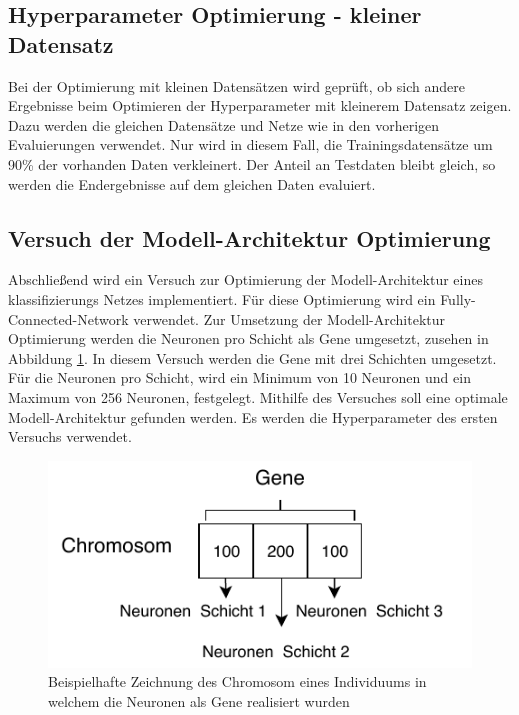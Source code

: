 \subsection{Hyperparameter Optimierung - kleiner Datensatz}
Bei der Optimierung mit kleinen Datensätzen wird geprüft, ob sich andere Ergebnisse beim Optimieren der Hyperparameter mit kleinerem Datensatz zeigen. Dazu werden die gleichen Datensätze und Netze wie in den vorherigen Evaluierungen verwendet. Nur wird in diesem Fall, die Trainingsdatensätze um 90\% der vorhanden Daten verkleinert. Der Anteil an Testdaten bleibt gleich, so werden die Endergebnisse auf dem gleichen Daten evaluiert.

\subsection{Versuch der Modell-Architektur Optimierung}
Abschließend wird ein Versuch zur Optimierung der Modell-Architektur eines klassifizierungs Netzes implementiert. Für diese Optimierung wird ein Fully-Connected-Network verwendet. Zur Umsetzung der Modell-Architektur Optimierung werden die Neuronen pro Schicht als Gene umgesetzt, zusehen in Abbildung \ref{fig:gene_neuronen}. In diesem Versuch werden die Gene mit drei Schichten umgesetzt. Für die Neuronen pro Schicht, wird ein Minimum von 10 Neuronen und ein Maximum von 256 Neuronen, festgelegt. Mithilfe des Versuches soll eine optimale Modell-Architektur gefunden werden. Es werden die Hyperparameter des ersten Versuchs verwendet.

\begin{figure}[H]
  \centering  
  \includegraphics[scale=1.5]{img/gene_neuronen.pdf}
  \caption{Beispielhafte Zeichnung des Chromosom eines Individuums in welchem die Neuronen als Gene realisiert wurden}
  \label{fig:gene_neuronen}
\end{figure}

